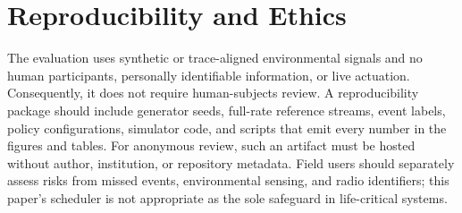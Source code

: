 \section{Reproducibility and Ethics}
\label{sec:ethics}

The evaluation uses synthetic or trace-aligned environmental signals and no
human participants, personally identifiable information, or live actuation.
Consequently, it does not require human-subjects review.  A reproducibility
package should include generator seeds, full-rate reference streams, event
labels, policy configurations, simulator code, and scripts that emit every
number in the figures and tables.  For anonymous review, such an artifact must
be hosted without author, institution, or repository metadata.  Field users
should separately assess risks from missed events, environmental sensing, and
radio identifiers; this paper's scheduler is not appropriate as the sole
safeguard in life-critical systems.
